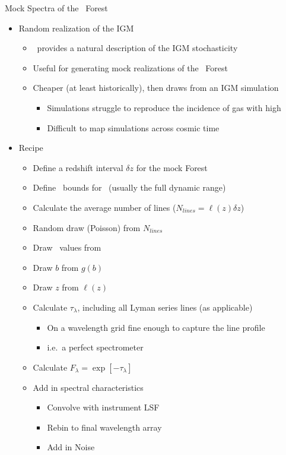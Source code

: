\documentclass[12pt,letterpaper]{article}
\begin{document}
\begin{Aenumerate}
{\bf \item Mock Spectra of the \lya\ Forest}
	\begin{itemize}
	\item Random realization of the IGM
		\begin{itemize}
		\item \fnhi\ provides a natural description of the IGM stochasticity
		\item Useful for generating mock realizations of the \lya\ Forest
		\item Cheaper (at least historically), then draws from an IGM simulation
			\begin{itemize}
			\item Simulations struggle to reproduce the incidence of
			gas with high \nhi
			\item Difficult to map simulations across cosmic time
			\end{itemize}
		\end{itemize}
	\item Recipe
		\begin{itemize}
		\item Define a redshift interval $\delta z$ for the mock Forest
		\item Define \nhi\ bounds for \fnhi\ (usually the full dynamic range)
		\item Calculate the average number of lines 
		($N_{lines} = \ell(z) \delta z$)
		\item Random draw (Poisson) from $N_{lines}$
		\item Draw \nhi\ values from \fnhi
		\item Draw $b$ from $g(b)$
		\item Draw $z$ from $\ell(z)$
		\item Calculate $\tau_\lambda$, including all 
		Lyman series lines (as applicable)
			\begin{itemize}
			\item On a wavelength grid fine enough to 
			capture the line profile
			\item i.e.\ a perfect spectrometer
			\end{itemize}
		\item Calculate $F_\lambda = \exp[-\tau_\lambda]$
		\item Add in spectral characteristics
			\begin{itemize}
			\item Convolve with instrument LSF
			\item Rebin to final wavelength array
			\item Add in Noise

\end{itemize}
\end{itemize}
\end{itemize}
\end{Aenumerate}
\end{document}
